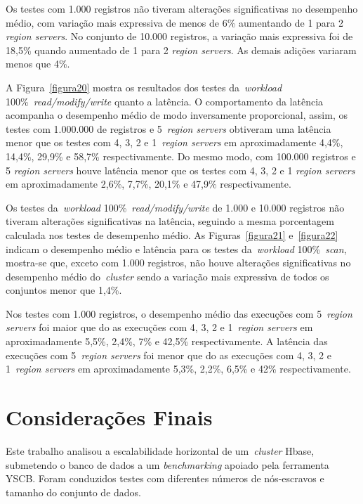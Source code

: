 \documentclass[12pt]{article}
\begin{document}
Os testes com 1.000 registros não tiveram alterações significativas no desempenho médio, com variação mais expressiva de menos de 6\% aumentando de 1 para 2 \emph{region servers}. 
No conjunto de 10.000 registros, a variação mais expressiva foi de 18,5\% quando aumentado de 1 para 2 \emph{region servers}. As demais adições variaram menos que 4\%.

A Figura~\ref{figura20} mostra os resultados dos testes da~\emph{workload} 100\%~\emph{read/modify/write} quanto a latência. 
O comportamento da latência acompanha o desempenho médio de modo inversamente proporcional, assim, os testes com 1.000.000 de registros e 5~\emph{region servers} obtiveram uma latência menor que os testes com 4, 3, 2 e 1~\emph{region servers} em aproximadamente 4,4\%, 14,4\%, 29,9\% e 58,7\% respectivamente. 
Do mesmo modo,  com 100.000 registros e 5 \emph{region servers} houve latência menor que os testes com 4, 3, 2 e 1 \emph{region servers} em aproximadamente 2,6\%, 7,7\%, 20,1\% e 47,9\% respectivamente.

Os testes da~\emph{workload} 100\%~\emph{read/modify/write} de 1.000 e 10.000 registros não tiveram alterações significativas na latência, seguindo a mesma porcentagem calculada nos testes de desempenho médio. 
As Figuras~\ref{figura21} e~\ref{figura22} indicam o desempenho médio e latência para os testes da~\emph{workload} 100\%~\emph{scan},  mostra-se que, exceto com 1.000 registros, não houve alterações significativas no desempenho médio do~\emph{cluster} sendo a variação mais expressiva de todos os conjuntos menor que 1,4\%. 

Nos testes com 1.000 registros, o desempenho médio das execuções com 5~\emph{region servers} foi maior que do as execuções com 4, 3, 2 e 1~\emph{region servers} em aproximadamente 5,5\%, 2,4\%, 7\% e 42,5\% respectivamente. 
A latência das execuções com 5~\emph{region servers} foi menor que do as execuções com 4, 3, 2 e 1~\emph{region servers} em aproximadamente 5,3\%, 2,2\%, 6,5\% e 42\% respectivamente.

\section{Considerações Finais}
\label{sec:finais}

Este trabalho analisou a escalabilidade horizontal de um~\emph{cluster}  Hbase, submetendo o banco de dados a um \textit{benchmarking} apoiado pela ferramenta YSCB. Foram conduzidos testes com diferentes números de nós-escravos e tamanho do conjunto de dados.
\end{document}
